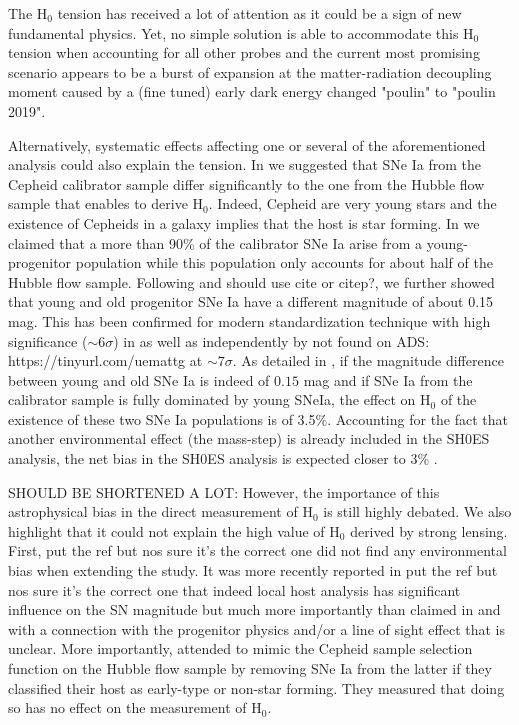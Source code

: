\documentclass[]{aa} %
\newcommand{\nn}[1]{{\textcolor[rgb]{1, 0.27, 0}{#1}}}
\begin{document}
The H$_0$ tension has received a lot of attention as it could be a sign of new
fundamental physics. Yet, no simple solution is able to accommodate this H$_0$
tension when accounting for all other probes and the current most promising
scenario appears to be a burst of expansion at the matter-radiation decoupling
moment caused by a (fine tuned) early dark energy \citep{poulin2019} \nn{changed
"poulin" to "poulin 2019"}.

Alternatively, systematic effects affecting one or several of the aforementioned
analysis could also explain the tension. In \cite{rigault2015} we suggested that
SNe Ia from the Cepheid calibrator sample differ significantly to the one from
the Hubble flow sample that enables to derive H$_0$. Indeed, Cepheid are very
young stars and the existence of Cepheids in a galaxy implies that the host is
star forming. In \citep{rigault2015} we claimed that a more than 90\% of the
calibrator SNe Ia arise from a young-progenitor population while this population
only accounts for about half of the Hubble flow sample. Following
\cite{sullivan2010} and \citep{rigault2013} \nn{should use cite or citep?}, we
further showed that young and old progenitor SNe Ia have a different magnitude
of about 0.15 mag. This has been confirmed for modern standardization technique
\citep[SALT2.4][]{guy2010,betoule2014} with high significance ($\sim 6\sigma$)
in \citep{rigault2018} as well as independently by \cite{roman2019} \nn{not
found on ADS: https://tinyurl.com/uemattg} at $\sim 7\sigma$. As detailed in
\citep{rigault2015}, if the magnitude difference between young and old SNe Ia is
indeed of $0.15$ mag and if SNe Ia from the calibrator sample is fully dominated
by young SNeIa, the effect on H$_0$ of the existence of these two SNe Ia
populations is of 3.5\%. Accounting for the fact that another environmental
effect (the mass-step) is already included in the SH0ES analysis, the net bias
in the SH0ES analysis is expected closer to 3\% \citep[see table 6
of][]{rigault2015}. 

SHOULD BE SHORTENED A LOT: However, the importance of this astrophysical bias in
the direct measurement of H$_0$ is still highly debated. We also highlight that
it could not explain the high value of H$_0$ derived by strong lensing. First,
\cite{jones2015} \nn{put the ref but nos sure it's the correct one} did not find
any environmental bias when extending the \citep{rigault2015} study. It was more
recently reported in \citep{jones2019} \nn{put the ref but nos sure it's the
correct one} that indeed local host analysis has significant influence on the SN
magnitude but much more importantly than claimed in \citep{rigault2018} and with
a connection with the progenitor physics and/or a line of sight effect that is
unclear. More importantly, \cite{riess2016} attended to mimic the Cepheid sample
selection function on the Hubble flow sample by removing SNe Ia from the latter
if they classified their host as early-type or non-star forming. They measured
that doing so has no effect on the measurement of H$_0$.
\end{document}

